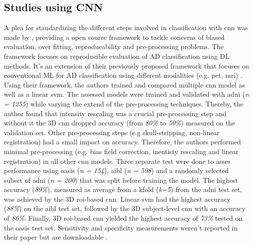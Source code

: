 

\subsection{Studies using CNN}


A plea for standardizing the different steps involved in classification with \gls{cnn} was made by \textcite{wenConvolutionalNeuralNetworks2020}, providing a open source framework to tackle concerns of biased evaluation, over fitting, reproducability and pre-processing problems. The framework focuses on reproducible evaluation of AD classification using \gls{DL} methods. It's an extension of their previously proposed framework that focuses on conventional \gls{ML} for AD classification using different modalities (e.g. \gls{pet}, \gls{mri}) \autocite{SAMPERGONZALEZ2018504}. 
Using their framework, the authors trained and compared multiple \gls{cnn} model as well as a linear \gls{svm}. The assessed models were trained and validated with \gls{adni} (\textit{n = 1255}) while varying the extend of the pre-processing techniques. Thereby, the author found that intensity rescaling was a crucial pre-processing step and without it the 3D \gls{cnn} dropped accuracy (from \textit{80\%} to \textit{50\%}) measured on the validation set. Other pre-processing steps (e.g skull-stripping, non-linear registration) had a small impact on accuracy. Therefore, the authors performed minimal pre-processing (e.g. bias field correction, inentisty rescaling and linear registration)  in all other \gls{cnn} models. 
Three separate test were done to asses performance using \gls{oasis} (\textit{n = 154}), \gls{aibl} (\textit{n = 598}) and a randomly selected subset of \gls{adni} (\textit{n = 200}) that was split before training the model. The highest accuracy (\textit{89\%}), measured as average from a \gls{kfold} (\textit{k=5}) from the \gls{adni} test set, was achieved by the 3D \gls{roi}-based \gls{cnn}. Linear \gls{svm} had the highest accuracy (\textit{88\%}) on the \gls{aibl} test set, followed by the 3D subject-level \gls{cnn} with an accuracy of \textit{86\%}. Finally, 3D \gls{roi}-based \gls{cnn} yielded the highest accuracy of \textit{73\%} tested on the \gls{oasis} test set. Sensitivity and specificity measurements weren't reported in their paper but are downloadable \autocite{wen_junhao_2019_3491003}.



